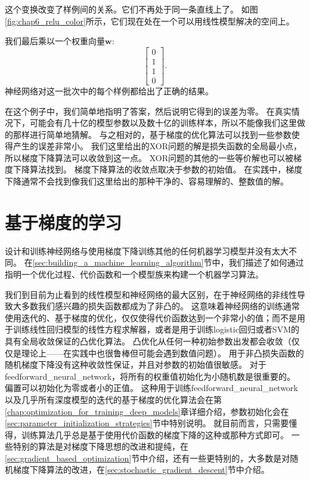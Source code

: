 
这个变换改变了样例间的关系。它们不再处于同一条直线上了。
如图\ref{fig:chap6_relu_color}所示，它们现在处在一个可以用线性模型解决的空间上。

我们最后乘以一个权重向量$\bm{w}$:
\begin{equation}
\begin{bmatrix}
0\\
1\\
1\\
0
\end{bmatrix}.
\end{equation}
神经网络对这一批次中的每个样例都给出了正确的结果。

在这个例子中，我们简单地指明了答案，然后说明它得到的误差为零。
在真实情况下，可能会有几十亿的模型参数以及数十亿的训练样本，所以不能像我们这里做的那样进行简单地猜解。
与之相对的，基于梯度的优化算法可以找到一些参数使得产生的误差非常小。
我们这里给出的XOR问题的解是损失函数的全局最小点，所以梯度下降算法可以收敛到这一点。
XOR问题的其他的一些等价解也可以被梯度下降算法找到。
梯度下降算法的收敛点取决于参数的初始值。
在实践中，梯度下降通常不会找到像我们这里给出的那种干净的、容易理解的、整数值的解。

\section{基于梯度的学习}
\label{sec:gradient_based_learning}

设计和训练神经网络与使用梯度下降训练其他的任何机器学习模型并没有太大不同。
在\ref{sec:building_a_machine_learning_algorithm}节中，我们描述了如何通过指明一个优化过程、代价函数和一个模型族来构建一个机器学习算法。

我们到目前为止看到的线性模型和神经网络的最大区别，在于神经网络的非线性导致大多数我们感兴趣的损失函数都成为了非凸的。
这意味着神经网络的训练通常使用迭代的、基于梯度的优化，仅仅使得代价函数达到一个非常小的值；而不是用于训练线性回归模型的线性方程求解器，或者是用于训练logistic回归或者SVM的具有全局收敛保证的凸优化算法。
凸优化从任何一种初始参数出发都会收敛（仅仅是理论上——在实践中也很鲁棒但可能会遇到数值问题）。
用于非凸损失函数的随机梯度下降没有这种收敛性保证，并且对参数的初始值很敏感。
对于\gls{feedforward_neural_network}，将所有的权重值初始化为小随机数是很重要的。
偏置可以初始化为零或者小的正值。
这种用于训练\gls{feedforward_neural_network}以及几乎所有深度模型的迭代的基于梯度的优化算法会在第\ref{chap:optimization_for_training_deep_models}章详细介绍，参数初始化会在\ref{sec:parameter_initialization_strategies}节中特别说明。
就目前而言，只需要懂得，训练算法几乎总是基于使用代价函数的梯度下降的这种或那种方式即可。
一些特别的算法是对梯度下降思想的改进和提纯，在\ref{sec:gradient_based_optimization}节中介绍，还有一些更特别的，大多数是对随机梯度下降算法的改进，在\ref{sec:stochastic_gradient_descent}节中介绍。

